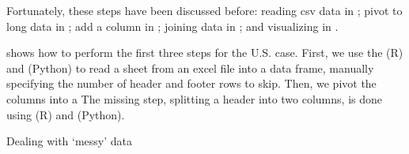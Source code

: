 Fortunately, these steps have been discussed before: reading csv data in ; pivot to long data in ;
add a column in ; joining data in ; and visualizing in .

 shows how to perform the first three steps for the U.S. case.
First, we use the  (R) and  (Python) to read a sheet from an excel file into a data frame,
manually specifying the number of header and footer rows to skip.
Then, we pivot the columns into a
The missing step, splitting a header into two columns, is done using  (R) and  (Python). 

\begin{ccsexample}
  \begin{tcolorbox}[title=Output]
    \texttt{[image: \{snippets/chapter07/excel2.r]}.png}
  \end{tcolorbox}
  \caption{Dealing with `messy' data}\label{ex:excel}
\end{ccsexample}
